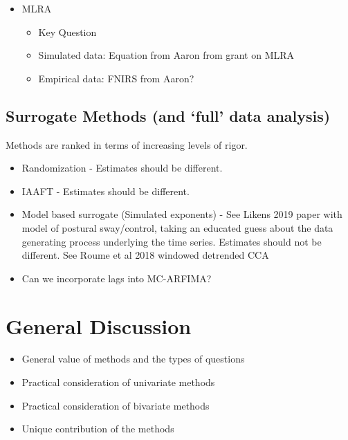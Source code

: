 \documentclass[
  english,
  man]{apa6}
\providecommand{\tightlist}{%
  \setlength{\itemsep}{0pt}\setlength{\parskip}{0pt}}
\begin{document}
\begin{itemize}
\item
  MLRA

  \begin{itemize}
  \tightlist
  \item
    Key Question
  \item
    Simulated data: Equation from Aaron from grant on MLRA
  \item
    Empirical data: FNIRS from Aaron?
  \end{itemize}
\end{itemize}

\hypertarget{surrogate-methods-and-full-data-analysis}{%
\subsection{Surrogate Methods (and `full' data analysis)}\label{surrogate-methods-and-full-data-analysis}}

Methods are ranked in terms of increasing levels of rigor.

\begin{itemize}
\tightlist
\item
  Randomization - Estimates should be different.
\item
  IAAFT - Estimates should be different.
\item
  Model based surrogate (Simulated exponents) - See Likens 2019 paper
  with model of postural sway/control, taking an educated guess about
  the data generating process underlying the time series. Estimates
  should not be different. See Roume et al 2018 windowed detrended CCA
\item
  Can we incorporate lags into MC-ARFIMA?
\end{itemize}

\hypertarget{general-discussion}{%
\section{General Discussion}\label{general-discussion}}

\begin{itemize}
\tightlist
\item
  General value of methods and the types of questions
\item
  Practical consideration of univariate methods
\item
  Practical consideration of bivariate methods
\item
  Unique contribution of the methods
\end{itemize}
\end{document}
